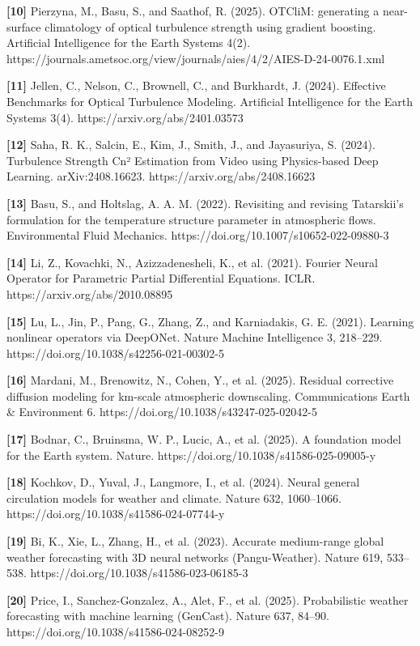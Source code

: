 \documentclass[
]{article}
\begin{document}
\textbf{{[}10{]}} Pierzyna, M., Basu, S., and Saathof, R. (2025).
OTCliM: generating a near-surface climatology of optical turbulence
strength using gradient boosting. Artificial Intelligence for the Earth
Systems 4(2).
https://journals.ametsoc.org/view/journals/aies/4/2/AIES-D-24-0076.1.xml

\textbf{{[}11{]}} Jellen, C., Nelson, C., Brownell, C., and Burkhardt,
J. (2024). Effective Benchmarks for Optical Turbulence Modeling.
Artificial Intelligence for the Earth Systems 3(4).
https://arxiv.org/abs/2401.03573

\textbf{{[}12{]}} Saha, R. K., Salcin, E., Kim, J., Smith, J., and
Jayasuriya, S. (2024). Turbulence Strength Cn² Estimation from Video
using Physics-based Deep Learning. arXiv:2408.16623.
https://arxiv.org/abs/2408.16623

\textbf{{[}13{]}} Basu, S., and Holtslag, A. A. M. (2022). Revisiting
and revising Tatarskii's formulation for the temperature structure
parameter in atmospheric flows. Environmental Fluid Mechanics.
https://doi.org/10.1007/s10652-022-09880-3

\textbf{{[}14{]}} Li, Z., Kovachki, N., Azizzadenesheli, K., et al.
(2021). Fourier Neural Operator for Parametric Partial Differential
Equations. ICLR. https://arxiv.org/abs/2010.08895

\textbf{{[}15{]}} Lu, L., Jin, P., Pang, G., Zhang, Z., and Karniadakis,
G. E. (2021). Learning nonlinear operators via DeepONet. Nature Machine
Intelligence 3, 218--229. https://doi.org/10.1038/s42256-021-00302-5

\textbf{{[}16{]}} Mardani, M., Brenowitz, N., Cohen, Y., et al. (2025).
Residual corrective diffusion modeling for km-scale atmospheric
downscaling. Communications Earth \& Environment 6.
https://doi.org/10.1038/s43247-025-02042-5

\textbf{{[}17{]}} Bodnar, C., Bruinsma, W. P., Lucic, A., et al. (2025).
A foundation model for the Earth system. Nature.
https://doi.org/10.1038/s41586-025-09005-y

\textbf{{[}18{]}} Kochkov, D., Yuval, J., Langmore, I., et al. (2024).
Neural general circulation models for weather and climate. Nature 632,
1060--1066. https://doi.org/10.1038/s41586-024-07744-y

\textbf{{[}19{]}} Bi, K., Xie, L., Zhang, H., et al. (2023). Accurate
medium-range global weather forecasting with 3D neural networks
(Pangu-Weather). Nature 619, 533--538.
https://doi.org/10.1038/s41586-023-06185-3

\textbf{{[}20{]}} Price, I., Sanchez-Gonzalez, A., Alet, F., et al.
(2025). Probabilistic weather forecasting with machine learning
(GenCast). Nature 637, 84--90.
https://doi.org/10.1038/s41586-024-08252-9
\end{document}
